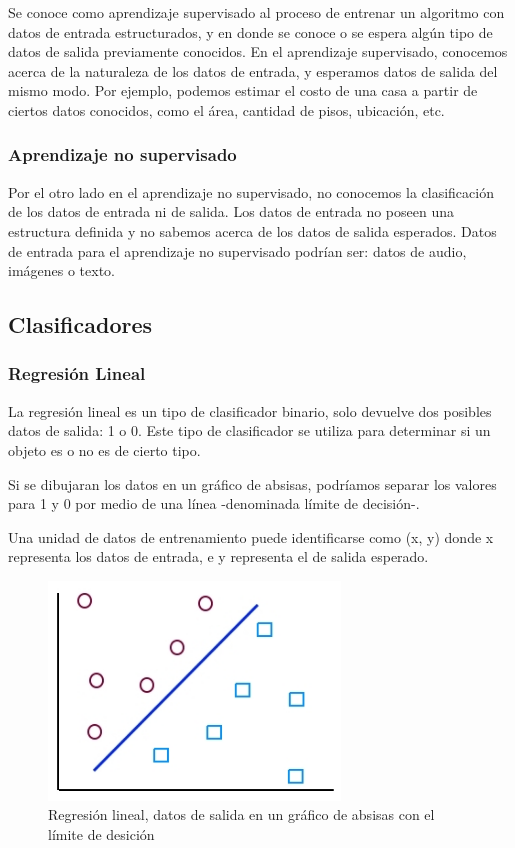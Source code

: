 \documentclass[a4paper,12pt,twoside]{article}
\begin{document}
Se conoce como aprendizaje supervisado al proceso de entrenar un algoritmo con datos de entrada estructurados, y en donde se conoce o se espera algún tipo de datos de salida previamente conocidos. En el aprendizaje supervisado, conocemos acerca de la naturaleza de los datos de entrada, y esperamos datos de salida del mismo modo. Por ejemplo, podemos estimar el costo de una casa a partir de ciertos datos conocidos, como el área, cantidad de pisos, ubicación, etc.\par

\subsubsection{Aprendizaje no supervisado}

Por el otro lado en el aprendizaje no supervisado, no conocemos la clasificación de los datos de entrada ni de salida. Los datos de entrada no poseen una estructura definida y no sabemos acerca de los datos de salida esperados. Datos de entrada para el aprendizaje no supervisado podrían ser: datos de audio, imágenes o texto. \par


\subsection{Clasificadores}

\subsubsection{Regresión Lineal}

La regresión lineal es un tipo de clasificador binario, solo devuelve dos posibles datos de salida: 1 o 0. Este tipo de clasificador se utiliza para determinar si un objeto es o no es de cierto tipo.

Si se dibujaran los datos en un gráfico de absisas, podríamos separar los valores para 1 y 0 por medio de una línea -denominada límite de decisión-.

Una unidad de datos de entrenamiento puede identificarse como (x, y) donde x representa los datos de entrada, e y representa el de salida esperado. 

\begin{figure}[h!]
	\includegraphics[width=220pt]{Imagenes/regresion1.jpg}
	\caption{Regresión lineal, datos de salida en un gráfico de absisas con el límite de desición}
	\label{fig:regresion1}
\end{figure}
\end{document}
